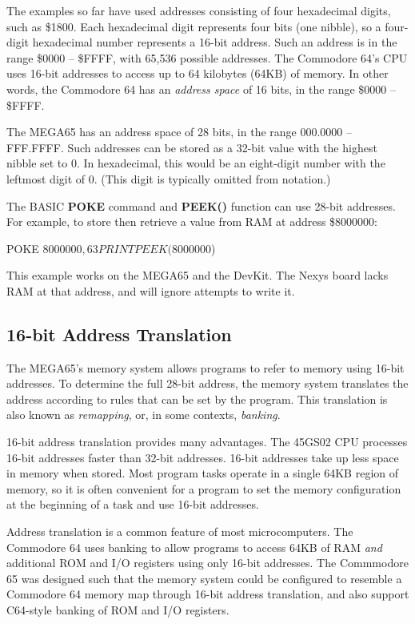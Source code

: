 The examples so far have used addresses consisting of four hexadecimal digits,
such as \$1800. Each hexadecimal digit represents four bits (one nibble), so a
four-digit hexadecimal number represents a 16-bit address. Such an address is
in the range \$0000 -- \$FFFF, with 65,536 possible addresses. The Commodore
64's CPU uses 16-bit addresses to access up to 64 kilobytes (64KB) of memory.
In other words, the Commodore 64 has an \emph{address space} of 16 bits, in the
range \$0000 -- \$FFFF.

The MEGA65 has an address space of 28 bits, in the
range 000.0000 -- FFF.FFFF. Such addresses can be stored as a 32-bit value with
the highest nibble set to 0. In hexadecimal, this would be an
eight-digit number with the leftmost digit of 0. (This digit is typically
omitted from notation.)

The BASIC {\bf POKE} command and {\bf PEEK()} function can use 28-bit
addresses. For example, to store then retrieve a value from RAM at address \$8000000:

\begin{screencode}
POKE $8000000,63
PRINT PEEK($8000000)
\end{screencode}

This example works on the MEGA65 and the DevKit. The Nexys board lacks RAM
at that address, and will ignore attempts to write it.

\subsection{16-bit Address Translation}

The MEGA65's memory system allows programs to refer to memory using 16-bit
addresses. To determine the full 28-bit address, the memory system translates
the address according to rules that can be set by the program. This translation
is also known as {\em remapping}, or, in some contexts, {\em
banking}.

16-bit address translation provides many advantages. The 45GS02 CPU processes
16-bit addresses faster than 32-bit addresses. 16-bit addresses take up less
space in memory when stored. Most program tasks operate in a single 64KB region
of memory, so it is often convenient for a program to set the memory
configuration at the beginning of a task and use 16-bit addresses.

Address translation is a common feature of most microcomputers. The Commodore
64 uses banking to allow programs to access 64KB of RAM {\em and} additional
ROM and I/O registers using only 16-bit addresses. The Commmodore 65 was
designed such that the memory system could be configured to resemble a
Commodore 64 memory map through 16-bit address translation, and also support
C64-style banking of ROM and I/O registers.

